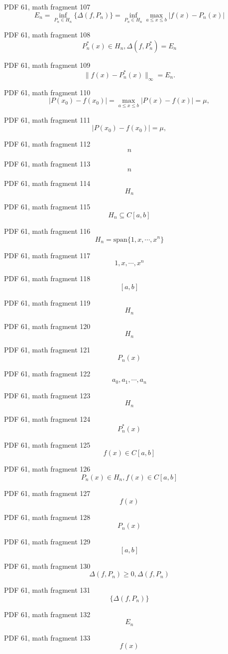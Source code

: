 \documentclass[UTF8,fontset=fandol]{ctexart}
\begin{document}
PDF 61, math fragment 107
\[
E_n = \inf_{P_n \in H_n} \{\Delta(f,P_n)\} = \inf_{P_n \in H_n} \max_{a \leqslant x \leqslant b} |f(x) - P_n(x)| \tag{3.2.2}
\]
\par
PDF 61, math fragment 108
\[
P_n^*(x) \in H_n, \Delta(f,P_n^*) = E_n \tag{3.2.3}
\]
\par
PDF 61, math fragment 109
\[
\|f(x) - P_n^*(x)\|_\infty = E_n.
\]
\par
PDF 61, math fragment 110
\[
|P(x_0) - f(x_0)| = \max_{a \leqslant x \leqslant b}|P(x) - f(x)| = \mu,
\]
\par
PDF 61, math fragment 111
\[
|P(x_0) - f(x_0)| = \mu,
\]
\par
PDF 61, math fragment 112
\[n\]
\par
PDF 61, math fragment 113
\[n\]
\par
PDF 61, math fragment 114
\[H_n\]
\par
PDF 61, math fragment 115
\[H_n \subseteq C[a,b]\]
\par
PDF 61, math fragment 116
\[H_n = \text{span}\{1,x,\cdots,x^n\}\]
\par
PDF 61, math fragment 117
\[1,x,\cdots,x^n\]
\par
PDF 61, math fragment 118
\[[a,b]\]
\par
PDF 61, math fragment 119
\[H_n\]
\par
PDF 61, math fragment 120
\[H_n\]
\par
PDF 61, math fragment 121
\[P_n(x)\]
\par
PDF 61, math fragment 122
\[a_0,a_1,\cdots,a_n\]
\par
PDF 61, math fragment 123
\[H_n\]
\par
PDF 61, math fragment 124
\[P_n^*(x)\]
\par
PDF 61, math fragment 125
\[f(x) \in C[a,b]\]
\par
PDF 61, math fragment 126
\[P_n(x) \in H_n, f(x) \in C[a,b]\]
\par
PDF 61, math fragment 127
\[f(x)\]
\par
PDF 61, math fragment 128
\[P_n(x)\]
\par
PDF 61, math fragment 129
\[[a,b]\]
\par
PDF 61, math fragment 130
\[\Delta(f,P_n) \geqslant 0, \Delta(f,P_n)\]
\par
PDF 61, math fragment 131
\[\{\Delta(f,P_n)\}\]
\par
PDF 61, math fragment 132
\[E_n\]
\par
PDF 61, math fragment 133
\[f(x)\]
\par
\end{document}
